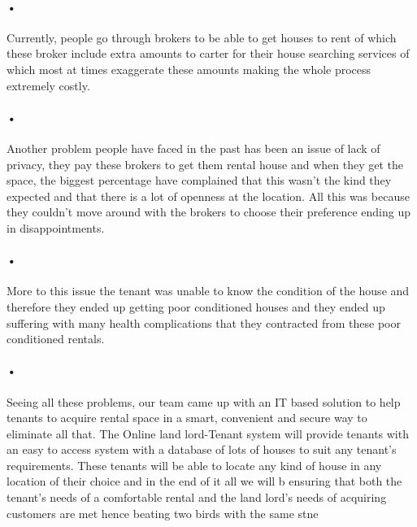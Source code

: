 \documentclass[a4paper,12pt]{article}
\begin{document}
\paragraph{•}
    Currently, people go through brokers to be able to get houses to rent of which these broker include extra amounts to carter for their house searching services of which most at times exaggerate these amounts making the whole process extremely costly.  
\paragraph{•}
   Another problem people have faced in the past has been an issue of lack of privacy, they pay these brokers to get them rental house and when they get the space, the biggest percentage have complained that this wasn’t the kind they expected and that there is a lot of openness at the location. All this was because they couldn’t move around with the brokers to choose their preference ending up in disappointments.
\paragraph{•}
  More to this issue the tenant was unable to know the condition of the house and therefore they ended up getting poor conditioned houses and they ended up suffering with many health complications that they contracted from these poor conditioned rentals.
\paragraph{•}
Seeing all these problems, our team came up with an IT based solution to help tenants to acquire rental space in a smart, convenient and secure way to eliminate all that. The Online land lord-Tenant system will provide tenants with an easy to access system with a database of lots of houses to suit any tenant’s requirements. These tenants will be able to locate any kind of house in any location of their choice  and in the end of it all we will b ensuring that both the tenant’s needs of a comfortable rental and the land lord’s needs of acquiring customers are met hence beating two birds with the same stne 
\end{document}
